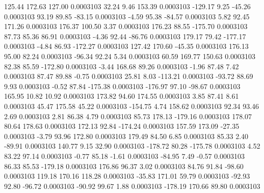       125.44      172.63      127.00     0.0003103
       32.24        9.46      153.39     0.0003103
     -129.17        9.25      -45.26     0.0003103
       93.19       89.85      -83.15     0.0003103
       -4.59       95.38      -84.57     0.0003103
        5.82       92.45      171.26     0.0003103
      176.37      100.50        3.37     0.0003103
      176.23       88.55     -175.70     0.0003103
       87.73       85.36       86.91     0.0003103
       -4.36       92.44      -86.76     0.0003103
      179.17       79.42     -177.17     0.0003103
       -4.84       86.93     -172.27     0.0003103
      127.42      170.60      -45.35     0.0003103
      176.13       95.00       82.24     0.0003103
      -96.34       92.24        5.34     0.0003103
       60.59      169.77      150.63     0.0003103
       82.38       85.59     -172.80     0.0003103
       -3.44      168.68       89.26     0.0003103
       -1.96       87.48        7.42     0.0003103
       87.47       89.88       -0.75     0.0003103
       25.81        8.03     -113.21     0.0003103
      -93.72       88.69        9.93     0.0003103
       -0.52       87.84     -175.38     0.0003103
     -176.97       97.10      -98.67     0.0003103
      165.95       10.82       10.92     0.0003103
      173.82       94.60      174.55     0.0003103
        3.85       87.41        8.61     0.0003103
       45.47      175.58       45.22     0.0003103
     -154.75        4.74      158.62     0.0003103
       92.34       93.46        2.69     0.0003103
        2.81       86.38        4.79     0.0003103
       85.73      178.13     -179.16     0.0003103
      178.07       80.64      178.63     0.0003103
      172.13       92.84     -174.24     0.0003103
      157.59      173.09      -27.35     0.0003103
       -3.79       93.96      172.80     0.0003103
      179.49       84.50        6.85     0.0003103
       85.33        2.40      -89.91     0.0003103
      140.77        9.15       32.90     0.0003103
     -178.72       80.28     -175.78     0.0003103
        4.52       83.22       97.14     0.0003103
       -0.77       85.18       -1.61     0.0003103
      -84.95        7.49       -0.57     0.0003103
       86.33       85.53     -179.18     0.0003103
      176.86       96.37        3.02     0.0003103
       84.76       91.84      -98.60     0.0003103
      119.18      170.16      118.28     0.0003103
      -35.83      171.01       59.79     0.0003103
      -92.93       92.80      -96.72     0.0003103
      -90.92       99.67        1.88     0.0003103
     -178.19      170.66       89.80     0.0003103
